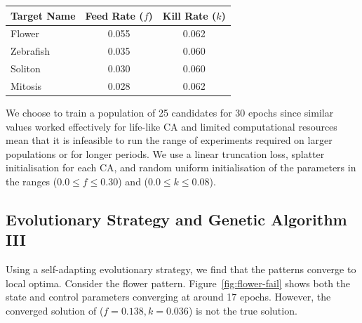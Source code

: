 \begin{center}
    \begin{tabular}{ |l|c|c| }
        \hline
        Target Name & Feed Rate ($f$) & Kill Rate ($k$)\\
        \hline
        Flower & 0.055 & 0.062\\
        Zebrafish & 0.035 & 0.060\\
        Soliton & 0.030 & 0.060\\
        Mitosis & 0.028 & 0.062\\
        \hline
    \end{tabular}
\end{center}

We choose to train a population of 25 candidates for 30 epochs since similar values worked effectively for life-like CA and limited computational resources mean that it is infeasible to run the range of experiments required on larger populations or for longer periods. We use a linear truncation loss, splatter initialisation for each CA, and random uniform initialisation of the parameters in the ranges ($0.0 \leq f \leq 0.30$) and ($0.0 \leq k \leq 0.08$).

\subsection{Evolutionary Strategy and Genetic Algorithm III}

Using a self-adapting evolutionary strategy, we find that the patterns converge to local optima. Consider the flower pattern. Figure~\ref{fig:flower-fail} shows both the state and control parameters converging at around 17 epochs. However, the converged solution of ($f = 0.138, k = 0.036$) is not the true solution.\\

